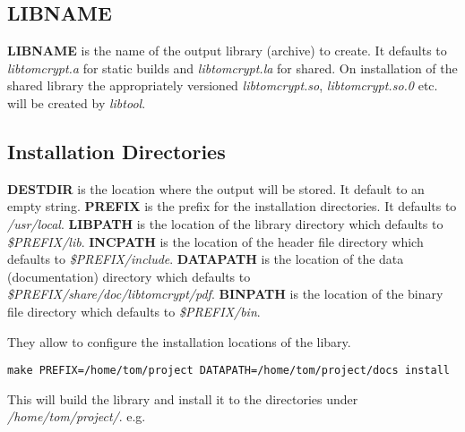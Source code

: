 \documentclass[synpaper]{book}
\begin{document}
\subsection{LIBNAME}
\textbf{LIBNAME} is the name of the output library (archive) to create.  It defaults to \textit{libtomcrypt.a} for static builds and \textit{libtomcrypt.la} for
shared.
On installation of the shared library the appropriately versioned \textit{libtomcrypt.so}, \textit{libtomcrypt.so.0} etc. will be created by \textit{libtool}.

\subsection{Installation Directories}
     
\textbf{DESTDIR} is the location where the output will be stored.  It default to an empty string.
\textbf{PREFIX} is the prefix for the installation directories.  It defaults to \textit{/usr/local}.
\textbf{LIBPATH} is the location of the library directory which defaults to \textit{\$PREFIX/lib}.
\textbf{INCPATH} is the location of the header file directory which defaults to \textit{\$PREFIX/include}.
\textbf{DATAPATH} is the location of the data (documentation) directory which defaults to \textit{\$PREFIX/share/doc/libtomcrypt/pdf}.
\textbf{BINPATH} is the location of the binary file directory which defaults to \textit{\$PREFIX/bin}.

They allow to configure the installation locations of the libary.

\begin{verbatim}
make PREFIX=/home/tom/project DATAPATH=/home/tom/project/docs install
\end{verbatim}

This will build the library and install it to the directories under \textit{/home/tom/project/}.  e.g.
\end{document}
